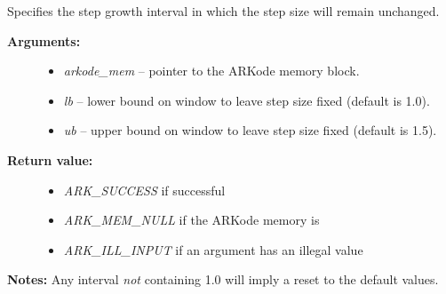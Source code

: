 \documentclass[letterpaper,10pt,english]{sphinxmanual}
\begin{document}
\begin{fulllineitems}
\label{c_interface/User_callable:ARKodeSetFixedStepBounds}
Specifies the step growth interval in which the step size will remain unchanged.
\begin{description}
\item[{\textbf{Arguments:}}] \leavevmode\begin{itemize}
\item {} 
\emph{arkode\_mem} -- pointer to the ARKode memory block.

\item {} 
\emph{lb} -- lower bound on window to leave step size fixed (default is 1.0).

\item {} 
\emph{ub} -- upper bound on window to leave step size fixed (default is 1.5).

\end{itemize}

\item[{\textbf{Return value:}}] \leavevmode\begin{itemize}
\item {} 
\emph{ARK\_SUCCESS} if successful

\item {} 
\emph{ARK\_MEM\_NULL} if the ARKode memory is 

\item {} 
\emph{ARK\_ILL\_INPUT} if an argument has an illegal value

\end{itemize}

\end{description}

\textbf{Notes:} Any interval \emph{not} containing 1.0 will imply a reset to the default values.

\end{fulllineitems}

\end{document}
